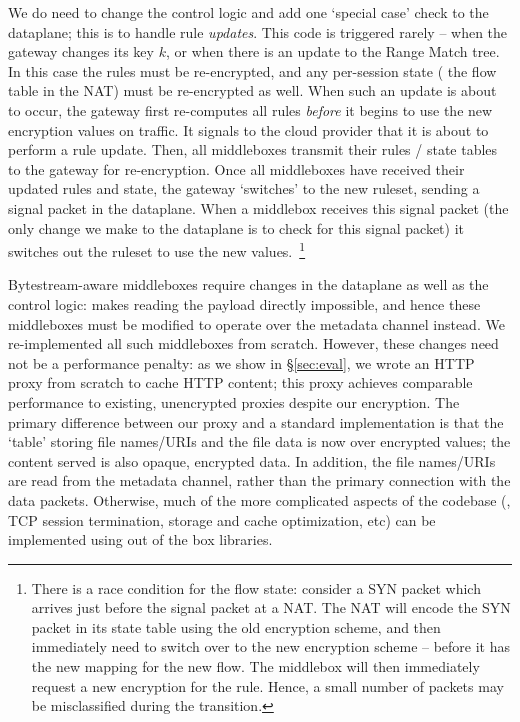 We do need to change the control logic and add one `special case' check to the dataplane; this is to handle rule {\it updates}. 
This code is triggered rarely -- when the gateway changes its key $k$, or when there is an update to the Range Match tree.
In this case the rules must be re-encrypted, and any per-session state (\eg{} the flow table in the NAT) must be re-encrypted as well.
When such an update is about to occur, the gateway first re-computes all rules {\it before} it begins to use the new encryption values on traffic. It signals to the cloud provider that it is about to perform a rule update. Then, all middleboxes transmit their rules / state tables to the gateway for re-encryption. 
Once all middleboxes have received their updated rules and state, the gateway `switches' to the new ruleset, sending a signal packet in the dataplane. When a middlebox receives this signal packet (the only change we make to the dataplane is to check for this signal packet) it switches out the ruleset to use the new values.~\footnote{\small There is a race condition for the flow state: consider a SYN packet which arrives just before the signal packet at a NAT. The NAT will encode the SYN packet in its state table using the old encryption scheme, and then immediately need to switch over to the new encryption scheme -- before it has the new mapping for the new flow. The middlebox will then immediately request a new encryption for the rule. Hence, a small number of packets may be misclassified during the transition.}

Bytestream-aware middleboxes require changes in the dataplane as well as the control logic: \sys makes reading the payload directly impossible, and hence these middleboxes must be modified to operate over the metadata channel instead.
We re-implemented all such middleboxes from scratch.
However, these changes need not be a performance penalty: as we show in \S\ref{sec:eval}, we wrote an HTTP proxy from scratch to cache HTTP content; this proxy achieves comparable performance to existing, unencrypted proxies despite our encryption.
The primary difference between our proxy and a standard implementation is that the `table' storing file names/URIs and the file data is now over encrypted values; the content served is also opaque, encrypted data. 
In addition, the file names/URIs are read from the metadata channel, rather than the primary connection with the data packets. 
Otherwise, much of the more complicated aspects of the codebase (\eg{}, TCP session termination, storage and cache optimization, etc) can be implemented using out of the box libraries.

